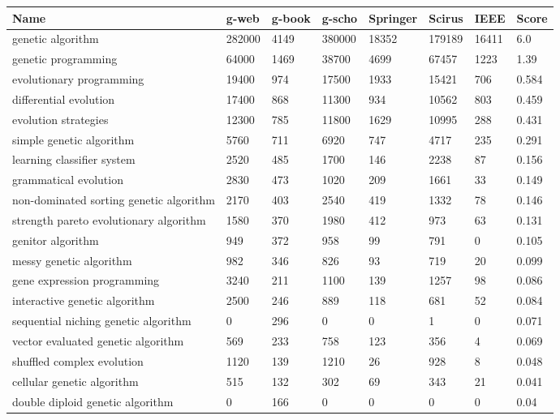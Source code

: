 \documentclass[a4paper, 11pt]{article}
\begin{document}
\begin{table}[ht]
	\centering\footnotesize
		\begin{tabularx}{\textwidth}{Xlllllll}
		\toprule
		\textbf{Name} & \textbf{g-web} & \textbf{g-book} & \textbf{g-scho} & \textbf{Springer} & \textbf{Scirus} & \textbf{IEEE} & \textbf{Score} \\ 
		\toprule
		genetic algorithm & 282000 & 4149 & 380000 & 18352 & 179189 & 16411 & 6.0 \\
		genetic programming & 64000 & 1469 & 38700 & 4699 & 67457 & 1223 & 1.39 \\
		evolutionary programming & 19400 & 974 & 17500 & 1933 & 15421 & 706 & 0.584 \\
		differential evolution & 17400 & 868 & 11300 & 934 & 10562 & 803 & 0.459 \\
		evolution strategies & 12300 & 785 & 11800 & 1629 & 10995 & 288 & 0.431 \\
		simple genetic algorithm & 5760 & 711 & 6920 & 747 & 4717 & 235 & 0.291 \\
		learning classifier system & 2520 & 485 & 1700 & 146 & 2238 & 87 & 0.156 \\
		grammatical evolution & 2830 & 473 & 1020 & 209 & 1661 & 33 & 0.149 \\
		non-dominated sorting genetic algorithm & 2170 & 403 & 2540 & 419 & 1332 & 78 & 0.146 \\
		strength pareto evolutionary algorithm & 1580 & 370 & 1980 & 412 & 973 & 63 & 0.131 \\
		genitor algorithm & 949 & 372 & 958 & 99 & 791 & 0 & 0.105 \\
		messy genetic algorithm & 982 & 346 & 826 & 93 & 719 & 20 & 0.099 \\
		gene expression programming & 3240 & 211 & 1100 & 139 & 1257 & 98 & 0.086 \\
		interactive genetic algorithm & 2500 & 246 & 889 & 118 & 681 & 52 & 0.084 \\
		sequential niching genetic algorithm & 0 & 296 & 0 & 0 & 1 & 0 & 0.071 \\
		vector evaluated genetic algorithm & 569 & 233 & 758 & 123 & 356 & 4 & 0.069 \\
		shuffled complex evolution & 1120 & 139 & 1210 & 26 & 928 & 8 & 0.048 \\
		cellular genetic algorithm & 515 & 132 & 302 & 69 & 343 & 21 & 0.041 \\
		double diploid genetic algorithm & 0 & 166 & 0 & 0 & 0 & 0 & 0.04 \\

\end{tabularx}
\end{table}
\end{document}
